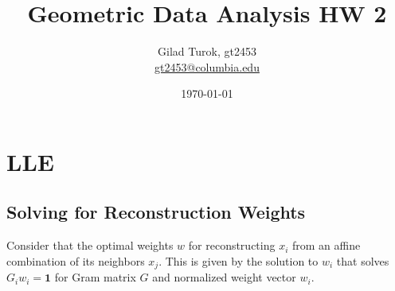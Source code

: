 \documentclass{article}
\title{Geometric Data Analysis HW 2}
\author{Gilad Turok, gt2453 \\ \href{mailto:gt2453@columbia.edu}{gt2453@columbia.edu}}
\date{\today}
\begin{document}
\maketitle

\section[]{LLE}

    \subsection{Solving for Reconstruction Weights}
        Consider that the optimal weights $w$ for reconstructing $x_i$ from an affine combination of its neighbors $x_j$. This is given by the solution to $w_i$ that solves $G_i w_i = \boldsymbol{1}$ for Gram matrix $G$ and normalized weight vector $w_i$.
\end{document}
